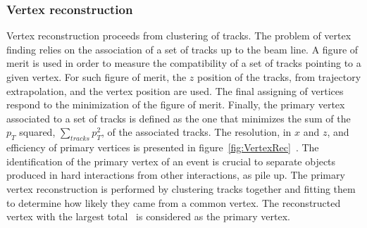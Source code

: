 \subsubsection{Vertex reconstruction}

Vertex reconstruction proceeds from clustering of tracks. The problem of vertex finding relies on the association of a set of tracks up to the beam line. A figure of merit is used in order to measure the compatibility of a set of tracks pointing to a given vertex. For such figure of merit, the $z$ position of the tracks, from trajectory extrapolation, and the vertex position are used. The final assigning of vertices respond to the minimization of the figure of merit. Finally, the primary vertex associated to a set of tracks is defined as the one that minimizes the sum of the $p_{T}$ squared, $\sum_{tracks}p_{T}^{2}$, of the associated tracks. The resolution, in $x$ and $z$, and efficiency of primary vertices is presented in figure~\ref{fig:VertexRec}~\cite{Chatrchyan:2014fea}. The identification of the primary vertex of an event is crucial to separate objects produced in hard interactions from other interactions, as pile up. The primary vertex reconstruction is performed by clustering tracks together and fitting them to determine how likely they came from a common vertex. The reconstructed vertex with the largest total \pt~is considered as the primary vertex.

